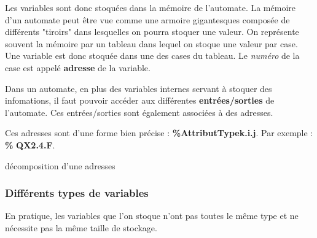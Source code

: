 
Les variables sont donc stoquées dans la mémoire de l'automate. La mémoire d'un automate peut être vue comme une armoire gigantesques composée de différents "tiroirs" dans lesquelles on pourra stoquer une valeur. On représente souvent la mémoire par un tableau dans lequel on stoque une valeur par case. Une variable est donc stoquée dans une des cases du tableau. Le \textit{numéro} de la case est appelé \textbf{adresse} de la variable.


Dans un automate, en plus des variables internes servant à stoquer des infomations, il faut pouvoir accéder aux différentes \textbf{entrées/sorties} de l'automate. Ces entrées/sorties sont également associées à des adresses.

Ces adresses sont d'une forme bien précise : \textbf{\%}\textbf{\color{green}Attribut}\textbf{\color{red}Type}\textbf{\color{blue}k.i.j}. Par exemple : \textbf{\%}\textbf{\color{green} Q}\textbf{\color{red}X}\textbf{\color{blue}2.4.F}.

\begin{table}[hb]
\centering
	
	\caption{décomposition d'une adresses}
\end{table}


\subsubsection{Différents types de variables}
En pratique, les variables que l'on stoque n'ont pas toutes le même type et ne nécessite pas la même taille de stockage.

